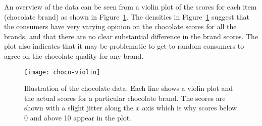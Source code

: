 \documentclass[aoas]{imsart}
\makeatletter
\newcommand{\code}[1]{\texttt{#1}\@\xspace}
\makeatother
\begin{document}
An overview of the data can be seen from a violin plot of the scores
for each item (chocolate brand) as shown in
Figure~\ref{fig:choco-violin}.  The densities in
Figure~\ref{fig:choco-violin} suggest that the consumers have very
varying opinion on the chocolate scores for all the brands, and that
there are no clear substantial difference in the brand scores. The
plot also indicates that it may be problematic to get to random
consumers to agree on the chocolate quality for any brand.


\begin{figure}%
  \centering
\texttt{[image: choco-violin]}
\caption{Illustration of the chocolate data. Each line shows a violin
  plot and the actual scores for a particular chocolate brand. The
  scores are shown with a slight jitter along the $x$ axis which is
  why scores below 0 and above 10 appear in the plot.}
\label{fig:choco-violin}
\end{figure}

\end{document}
